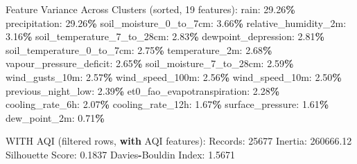 \documentclass[
  letterpaper,
  DIV=11,
  numbers=noendperiod]{scrartcl}
\newenvironment{Shaded}{\begin{snugshade}}{\end{snugshade}}
\newcommand{\BuiltInTok}[1]{#1}
\newcommand{\ControlFlowTok}[1]{\textcolor[rgb]{0.13,0.29,0.53}{\textbf{#1}}}
\newcommand{\DecValTok}[1]{\textcolor[rgb]{0.00,0.00,0.81}{#1}}
\newcommand{\FloatTok}[1]{\textcolor[rgb]{0.00,0.00,0.81}{#1}}
\newcommand{\NormalTok}[1]{#1}
\newcommand{\OperatorTok}[1]{\textcolor[rgb]{0.81,0.36,0.00}{\textbf{#1}}}
\begin{document}
\begin{Shaded}
\begin{Highlighting}[]
\NormalTok{  Feature Variance Across Clusters (}\BuiltInTok{sorted}\NormalTok{, }\DecValTok{19}\NormalTok{ features):}
\NormalTok{    rain: }\FloatTok{29.26}\OperatorTok{\%}
\NormalTok{    precipitation: }\FloatTok{29.26}\OperatorTok{\%}
\NormalTok{    soil\_moisture\_0\_to\_7cm: }\FloatTok{3.66}\OperatorTok{\%}
\NormalTok{    relative\_humidity\_2m: }\FloatTok{3.16}\OperatorTok{\%}
\NormalTok{    soil\_temperature\_7\_to\_28cm: }\FloatTok{2.83}\OperatorTok{\%}
\NormalTok{    dewpoint\_depression: }\FloatTok{2.81}\OperatorTok{\%}
\NormalTok{    soil\_temperature\_0\_to\_7cm: }\FloatTok{2.75}\OperatorTok{\%}
\NormalTok{    temperature\_2m: }\FloatTok{2.68}\OperatorTok{\%}
\NormalTok{    vapour\_pressure\_deficit: }\FloatTok{2.65}\OperatorTok{\%}
\NormalTok{    soil\_moisture\_7\_to\_28cm: }\FloatTok{2.59}\OperatorTok{\%}
\NormalTok{    wind\_gusts\_10m: }\FloatTok{2.57}\OperatorTok{\%}
\NormalTok{    wind\_speed\_100m: }\FloatTok{2.56}\OperatorTok{\%}
\NormalTok{    wind\_speed\_10m: }\FloatTok{2.50}\OperatorTok{\%}
\NormalTok{    previous\_night\_low: }\FloatTok{2.39}\OperatorTok{\%}
\NormalTok{    et0\_fao\_evapotranspiration: }\FloatTok{2.28}\OperatorTok{\%}
\NormalTok{    cooling\_rate\_6h: }\FloatTok{2.07}\OperatorTok{\%}
\NormalTok{    cooling\_rate\_12h: }\FloatTok{1.67}\OperatorTok{\%}
\NormalTok{    surface\_pressure: }\FloatTok{1.61}\OperatorTok{\%}
\NormalTok{    dew\_point\_2m: }\FloatTok{0.71}\OperatorTok{\%}

\NormalTok{WITH AQI (filtered rows, }\ControlFlowTok{with}\NormalTok{ AQI features):}
\NormalTok{  Records: }\DecValTok{25677}
\NormalTok{  Inertia: }\FloatTok{260666.12}
\NormalTok{  Silhouette Score: }\FloatTok{0.1837}
\NormalTok{  Davies}\OperatorTok{{-}}\NormalTok{Bouldin Index: }\FloatTok{1.5671}


\end{Highlighting}
\end{Shaded}
\end{document}

